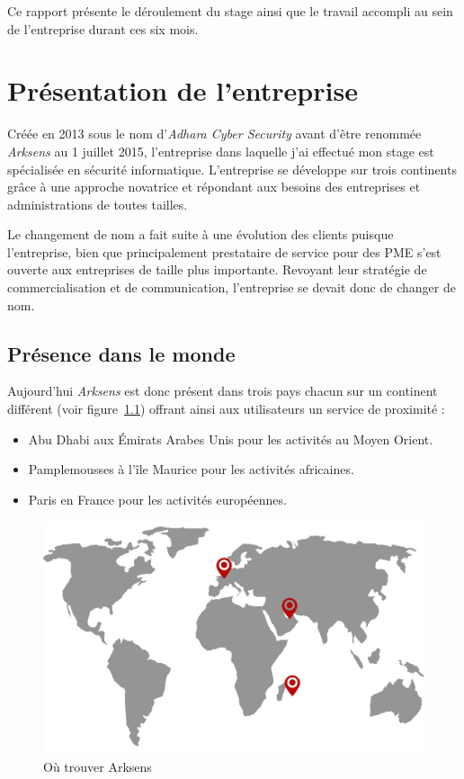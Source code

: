 \documentclass[a4paper,10pt, twoside]{report}
\begin{document}
\begin{spacing}{1.2}
Ce rapport présente le déroulement du stage ainsi que le travail accompli
au sein de l'entreprise durant ces six mois.

\chapter{Présentation de l'entreprise}
\thispagestyle{fancy}
Créée en 2013 sous le nom d'\textit{Adhara Cyber Security} avant
d'être renommée \textit{Arksens} au 1 juillet 2015, l'entreprise 
dans laquelle j'ai effectué mon stage est spécialisée en sécurité
informatique. L'entreprise se développe sur trois continents grâce à une
approche novatrice et répondant aux besoins des entreprises et
administrations de toutes tailles.

Le changement de nom a fait suite à une évolution des clients puisque
l'entreprise, bien que principalement prestataire de service pour des PME
s'est ouverte aux entreprises de taille plus importante. Revoyant leur
stratégie de commercialisation et de communication, l'entreprise se devait
donc de changer de nom.

\section{Présence dans le monde}
Aujourd'hui \textit{Arksens} est donc présent dans trois pays chacun sur
un continent différent (voir figure~\ref{mapArksens}) offrant ainsi aux
utilisateurs un service de proximité :
\begin{itemize}
  \item Abu Dhabi aux Émirats Arabes Unis pour les activités au Moyen
  Orient.
  \item Pamplemousses à l’île Maurice pour les activités africaines.
  \item Paris en France pour les activités européennes.
\end{itemize}

\begin{figure}[h!]
  \centering
  \includegraphics[scale=0.30]{map_arksens.png}
  \caption{\label{mapArksens} Où trouver Arksens}
\end{figure}
      

\end{spacing}
\end{document}
